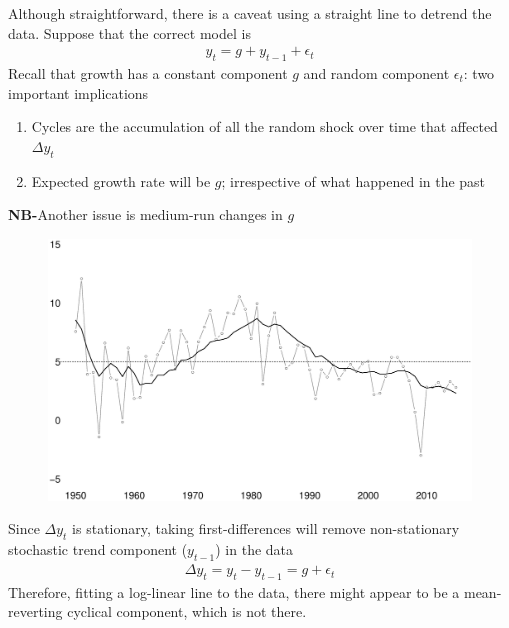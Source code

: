 \documentclass{beamer}
\begin{document}
\begin{frame}
 Although straightforward, there is a caveat using a straight line to detrend the data.
 Suppose that the correct model is
\begin{align}
 y_t = g+ y_{t-1} + \epsilon_t
\end{align}
\medskip
Recall that growth has a constant component $g$ and random component $\epsilon_t$: two important implications
\begin{enumerate}
  \item Cycles are the accumulation of all the random shock over time that affected $\Delta y_t$
  \item Expected growth rate will be $g$; irrespective of what happened in the past
\end{enumerate}
\medskip
\textbf{NB-}Another issue is medium-run changes in $g$
\end{frame}

\begin{frame}
  \begin{figure}
    \includegraphics[scale=.3]{us_gdp_g.eps}
  \end{figure}
\end{frame}


\begin{frame}
  Since $\Delta y_t$ is stationary, taking first-differences will remove non-stationary stochastic trend component ($y_{t-1}$) in the data
  \begin{align}
    \Delta y_t= y_t - y_{t-1}=g+\epsilon_t
  \end{align}
  \medskip
  Therefore, fitting a log-linear line to the data, there might appear to be a mean-reverting cyclical component, which is not there.  
\end{frame}
\end{document}
